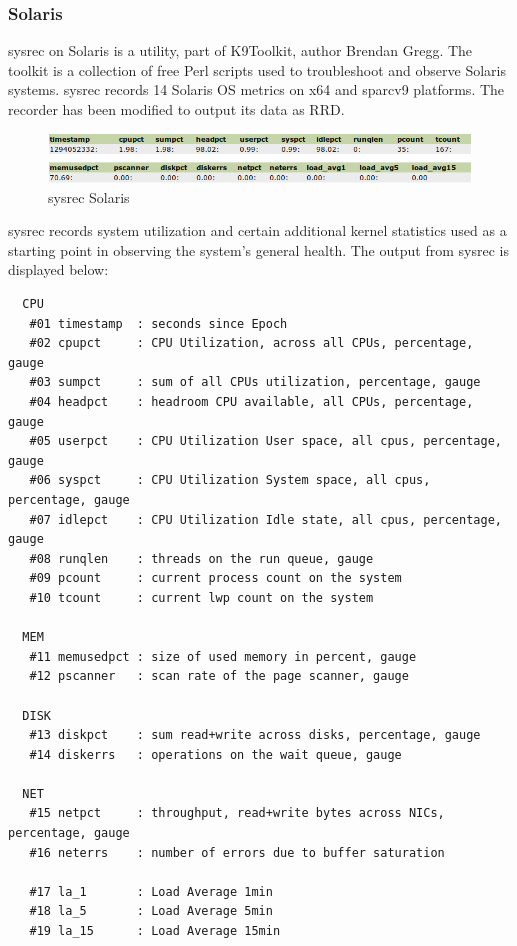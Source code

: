 \subsubsection{Solaris}
sysrec on Solaris is a utility, part of K9Toolkit, author Brendan Gregg. 
The toolkit is a collection of free Perl scripts used to troubleshoot and 
observe Solaris systems. sysrec records 14 Solaris OS metrics on x64 and
sparcv9 platforms. The recorder has been modified to output its data as RRD.

\begin{figure}[!ht]
\centering
\includegraphics[scale=0.62]{sysrec_sol.png}
\caption{sysrec Solaris}
\label{fig:sysrec.linux}
\end{figure}

sysrec records system utilization and certain additional kernel statistics
used as a starting point in observing the system's general health. The output
from sysrec is displayed below:

\begin{verbatim}
  CPU
   #01 timestamp  : seconds since Epoch
   #02 cpupct     : CPU Utilization, across all CPUs, percentage, gauge
   #03 sumpct     : sum of all CPUs utilization, percentage, gauge
   #04 headpct    : headroom CPU available, all CPUs, percentage, gauge
   #05 userpct    : CPU Utilization User space, all cpus, percentage, gauge
   #06 syspct     : CPU Utilization System space, all cpus, percentage, gauge
   #07 idlepct    : CPU Utilization Idle state, all cpus, percentage, gauge
   #08 runqlen    : threads on the run queue, gauge
   #09 pcount     : current process count on the system
   #10 tcount     : current lwp count on the system

  MEM
   #11 memusedpct : size of used memory in percent, gauge
   #12 pscanner   : scan rate of the page scanner, gauge
 
  DISK
   #13 diskpct    : sum read+write across disks, percentage, gauge
   #14 diskerrs   : operations on the wait queue, gauge

  NET
   #15 netpct     : throughput, read+write bytes across NICs, percentage, gauge
   #16 neterrs    : number of errors due to buffer saturation

   #17 la_1       : Load Average 1min
   #18 la_5       : Load Average 5min
   #19 la_15      : Load Average 15min
\end{verbatim}


